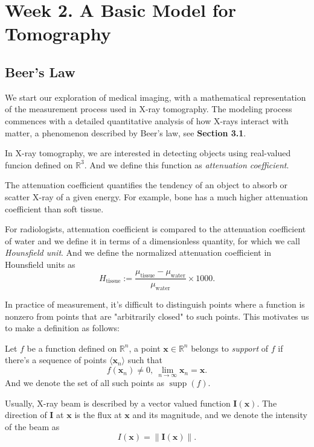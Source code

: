 \section{Week 2. A Basic Model for Tomography}
\subsection{Beer's Law}

We start our exploration of medical imaging, with a mathematical representation of the measurement process used in X-ray tomography. 
The modeling process commences with a detailed quantitative analysis of how X-rays interact with matter, a phenomenon described by Beer’s law, see \textbf{Section 3.1}.
\begin{df} 
In X-ray tomography, we are interested in detecting objects using real-valued funcion defined on $\mathbb R^3$. And we define this function as \textit{attenuation coefficient}.
\end{df}
The attenuation coefficient quantifies the tendency of an object to absorb or scatter X-ray of a given energy. For example, bone has a much higher attenuation coefficient than soft tissue.


\begin{df}
For radiologists, attenuation coefficient is compared to the attenuation coefficient of water and we define it in terms of a dimensionless quantity, for which we call \textit{Hounsfield unit}. And we define the normalized attenuation coefficient in Hounsfield units as 
\[H_{\text{tissue}}:=\frac{\mu_{\text{tissue}}-\mu_{\text{water}}}{\mu_{\text{water}}}\times 1000.\]  
\end{df}

In practice of measurement, it's difficult to distinguish points where a function is nonzero from points that are "arbitrarily closed" to such points. This motivates us to make a definition as follows:

\begin{df} Let $f$ be a function defined on $\mathbb R^n$, a point $\mathbf{x}\in\mathbb R^n$ belongs to \textit{support} of $f$ if there's a sequence of points $\langle \mathbf{x}_n\rangle$ such that 
\[f(\mathbf{x}_n)\neq 0,~ \lim_{n\to\infty}\mathbf{x}_n=\mathbf{x}.\]
And we denote the set of all such points as $\operatorname{supp}(f)$.
\end{df}

Usually, X-ray beam is described by a vector valued function $\mathbf{I}(\mathbf x)$. The direction of $\mathbf I$ at $\mathbf x$ is the flux at $\mathbf x$ and its magnitude, and we denote the intensity of the beam as \[I(\mathbf x)=\|\mathbf I(\mathbf x)\|.\]

